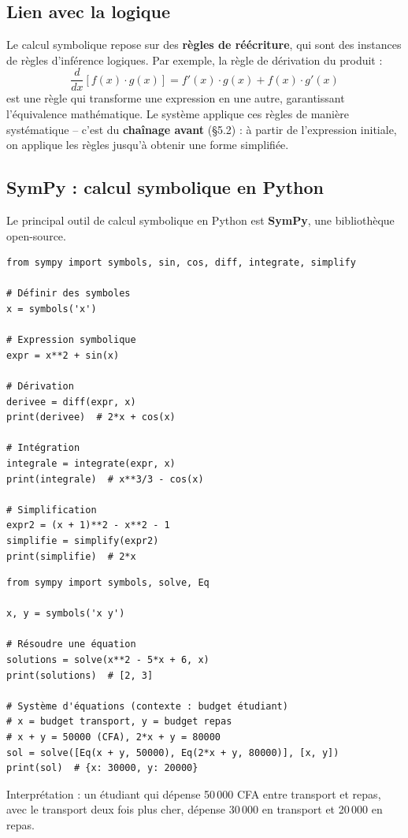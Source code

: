 \documentclass[11pt,a4paper]{article}
\begin{document}
\subsection{Lien avec la logique}

Le calcul symbolique repose sur des \textbf{règles de réécriture}, qui sont des instances de règles d'inférence logiques. Par exemple, la règle de dérivation du produit :
$$\frac{d}{dx}[f(x) \cdot g(x)] = f'(x) \cdot g(x) + f(x) \cdot g'(x)$$
est une règle qui transforme une expression en une autre, garantissant l'équivalence mathématique. Le système applique ces règles de manière systématique -- c'est du \textbf{chaînage avant} (§5.2) : à partir de l'expression initiale, on applique les règles jusqu'à obtenir une forme simplifiée.

\subsection{SymPy : calcul symbolique en Python}

Le principal outil de calcul symbolique en Python est \textbf{SymPy}, une bibliothèque open-source.

\begin{exemplebox}
\begin{lstlisting}
from sympy import symbols, sin, cos, diff, integrate, simplify

# Définir des symboles
x = symbols('x')

# Expression symbolique
expr = x**2 + sin(x)

# Dérivation
derivee = diff(expr, x)
print(derivee)  # 2*x + cos(x)

# Intégration
integrale = integrate(expr, x)
print(integrale)  # x**3/3 - cos(x)

# Simplification
expr2 = (x + 1)**2 - x**2 - 1
simplifie = simplify(expr2)
print(simplifie)  # 2*x
\end{lstlisting}
\end{exemplebox}

\begin{exemplebox}
\begin{lstlisting}
from sympy import symbols, solve, Eq

x, y = symbols('x y')

# Résoudre une équation
solutions = solve(x**2 - 5*x + 6, x)
print(solutions)  # [2, 3]

# Système d'équations (contexte : budget étudiant)
# x = budget transport, y = budget repas
# x + y = 50000 (CFA), 2*x + y = 80000
sol = solve([Eq(x + y, 50000), Eq(2*x + y, 80000)], [x, y])
print(sol)  # {x: 30000, y: 20000}
\end{lstlisting}

Interprétation : un étudiant qui dépense 50\,000 CFA entre transport et repas, avec le transport deux fois plus cher, dépense 30\,000 en transport et 20\,000 en repas.
\end{exemplebox}
\end{document}
